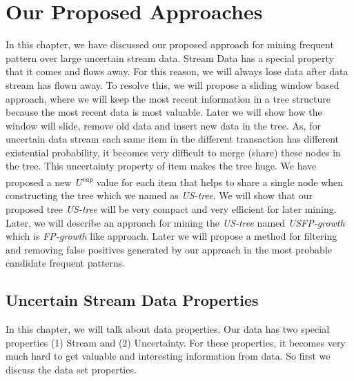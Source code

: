 %

\chapter{Our Proposed Approaches}

In this chapter, we have discussed our proposed approach for mining frequent pattern over large uncertain stream data. Stream Data has a special property that it comes and flows away. For this reason, we will always lose data after data stream has flown away. To resolve this, we will propose a sliding window based approach, where we will keep the most recent information in a tree structure because the most recent data is most valuable. Later we will show how the window will slide, remove old data and insert new data in the tree. As, for uncertain data stream each same item in the different transaction has different existential probability, it becomes very difficult to merge (share) these nodes in the tree. This uncertainty property of item makes the tree huge. We have proposed a new \emph{U\textsuperscript{cap}} value for each item that helps to share a single node when constructing the tree which we named as \emph{US-tree}. We will show that our proposed tree \emph{US-tree} will be very compact and very efficient for later mining. Later, we will describe an approach for mining the \emph {US-tree} named \emph{USFP-growth} which is \emph{FP-growth} like approach. Later we will propose a method for filtering and removing false positives generated by our approach in the most probable candidate frequent patterns.

\section{Uncertain Stream Data Properties}
    In this chapter, we will talk about data properties. Our data has two special properties (1) Stream and (2) Uncertainty. For these properties, it becomes very much hard to get valuable and interesting information from data. So first we discuss the data set properties.

